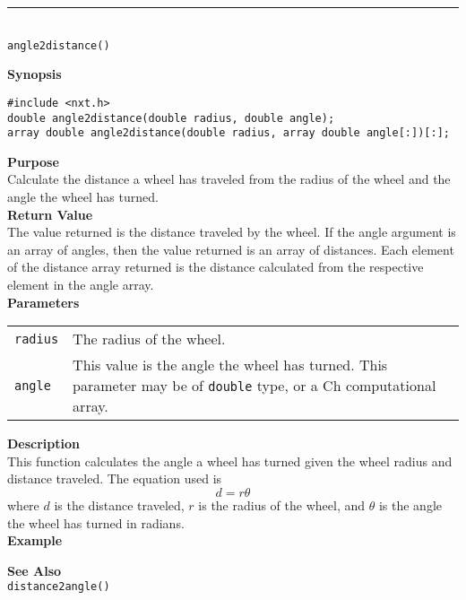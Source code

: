 \noindent
\vspace{5pt}
\rule{4.5in}{0.015in}\\
\noindent
{\LARGE \texttt{angle2distance()}}\\
{}

\noindent
{\bf Synopsis}
\vspace{-8pt}
\begin{verbatim}
#include <nxt.h>
double angle2distance(double radius, double angle);
array double angle2distance(double radius, array double angle[:])[:];
\end{verbatim}

\noindent
{\bf Purpose}\\
Calculate the distance a wheel has traveled from the radius of the wheel and
the angle the wheel has turned.\\

\noindent
{\bf Return Value}\\
The value returned is the distance traveled by the wheel. If the angle argument is an
array of angles, then the value returned is an array of distances. Each element
of the distance array returned is the distance calculated from the respective
element in the angle array.\\

\noindent
{\bf Parameters}
\vspace{-0.1in}
\begin{description}
\item               
\begin{tabular}{p{15 mm}p{145 mm}}
\texttt{radius} & The radius of the wheel. \\
\texttt{angle} & This value is the angle the wheel has turned. This parameter may be of \texttt{double} type, or a Ch computational array. \\
\end{tabular}
\end{description}

\noindent
{\bf Description}\\
This function calculates the angle a wheel has turned given the wheel 
radius and distance traveled. The equation used is
\begin{equation*}
d = r \theta
\end{equation*}
where $d$ is the distance traveled, $r$ is the radius of the wheel, and $\theta$ is
the angle the wheel has turned in radians.
\\

\noindent
{\bf Example}\\
\noindent

\noindent
{\bf See Also}\\
\texttt{distance2angle()}

